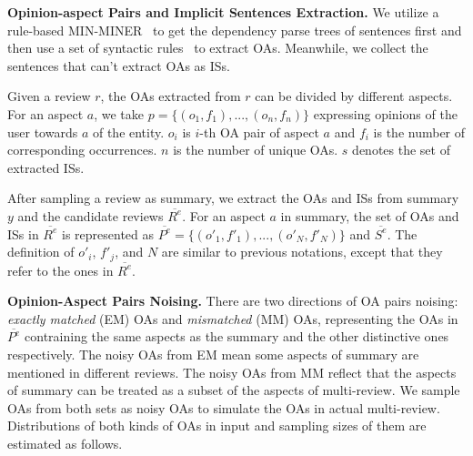 {\textbf{Opinion-aspect Pairs and Implicit Sentences Extraction.} 
We utilize a rule-based MIN-MINER~\cite{basicOpiMin20} to get the dependency parse trees of sentences first and then use a set of syntactic rules~\cite{aspect12} to extract OAs.
Meanwhile, we collect the sentences that can't extract OAs as ISs.

Given a review $r$, the OAs extracted from $r$ can be divided by different aspects.
For an aspect $a$,
we take $p=\{(o_{1}, f_1), ..., (o_{n}, f_n)\}$ %
expressing opinions of the user towards $a$ of the entity.
$o_{i}$ is $i$-th OA pair of aspect $a$ 
and $f_i$ is the number of corresponding occurrences.
$n$ is the number of unique OAs.
$s$ denotes the set of extracted ISs. 

After sampling a review as summary, 
we extract the OAs and ISs from summary $y$
and the candidate reviews $\overline{R^e}$.
For an aspect $a$ in summary,
the set of OAs and ISs in $\overline{R^e}$ is represented as $\overline{P^e}=\{(o'_{1}, f'_1), ..., (o'_{N}, f'_N)\}$ and $\overline{S^e}$.
The definition of $o'_{i}$, $f'_j$, and $N$ are similar to previous notations, except that they refer to the ones in $\overline{R^e}$.

\textbf{Opinion-Aspect Pairs Noising.}
There are two directions of OA pairs noising: 
{\em exactly matched} (EM) OAs and {\em mismatched} (MM) OAs, representing the OAs in $\overline{P^e}$ contraining the same aspects as the summary and the other distinctive ones respectively.
The noisy OAs from EM mean
some aspects of summary are mentioned in different reviews.
The noisy OAs from MM reflect that the aspects of summary can be treated as a subset 
of the aspects of multi-review. 
We sample OAs from both sets 
as noisy OAs to simulate the OAs in actual multi-review.
Distributions of 
both kinds of OAs in input and sampling sizes of them are estimated as follows.

}

